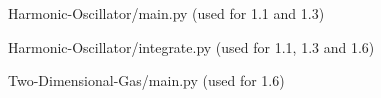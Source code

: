 \documentclass[a4paper, 12pt]{article}
\begin{document}

Harmonic-Oscillator/main.py (used for 1.1 and 1.3)


Harmonic-Oscillator/integrate.py (used for 1.1, 1.3 and 1.6)

\newpage

Two-Dimensional-Gas/main.py (used for 1.6)

\newpage
\end{document}
